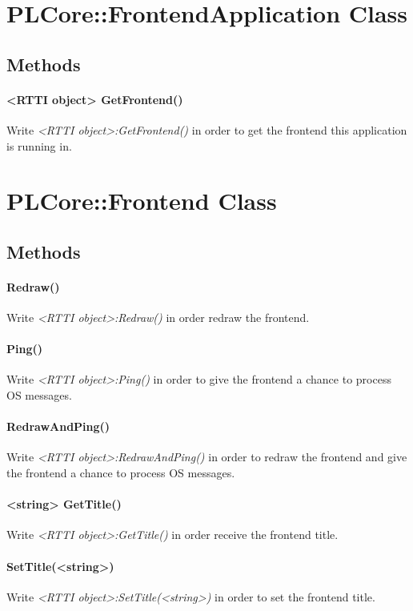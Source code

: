 \section{PLCore::FrontendApplication Class}


\subsection{Methods}

\paragraph{<RTTI object> GetFrontend()}
Write \emph{<RTTI object>:GetFrontend()} in order to get the frontend this application is running in.




\section{PLCore::Frontend Class}


\subsection{Methods}

\paragraph{Redraw()}
Write \emph{<RTTI object>:Redraw()} in order redraw the frontend.

\paragraph{Ping()}
Write \emph{<RTTI object>:Ping()} in order to give the frontend a chance to process \ac{OS} messages.

\paragraph{RedrawAndPing()}
Write \emph{<RTTI object>:RedrawAndPing()} in order to redraw the frontend and give the frontend a chance to process \ac{OS} messages.

\paragraph{<string> GetTitle()}
Write \emph{<RTTI object>:GetTitle()} in order receive the frontend title.

\paragraph{SetTitle(<string>)}
Write \emph{<RTTI object>:SetTitle(<string>)} in order to set the frontend title.

